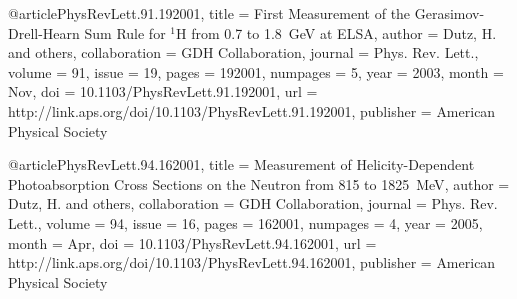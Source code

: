 @article{PhysRevLett.91.192001,
  title = {First Measurement of the Gerasimov-Drell-Hearn Sum Rule for $^{1}\mathrm{H}$ from 0.7 to 1.8~GeV at ELSA},
  author = {Dutz, H. and others},
  collaboration = {GDH Collaboration},
  journal = {Phys. Rev. Lett.},
  volume = {91},
  issue = {19},
  pages = {192001},
  numpages = {5},
  year = {2003},
  month = {Nov},
  doi = {10.1103/PhysRevLett.91.192001},
  url = {http://link.aps.org/doi/10.1103/PhysRevLett.91.192001},
  publisher = {American Physical Society}
}

@article{PhysRevLett.94.162001,
  title = {Measurement of Helicity-Dependent Photoabsorption Cross Sections on the Neutron from 815 to 1825~MeV},
  author = {Dutz, H. and others},
  collaboration = {GDH Collaboration},
  journal = {Phys. Rev. Lett.},
  volume = {94},
  issue = {16},
  pages = {162001},
  numpages = {4},
  year = {2005},
  month = {Apr},
  doi = {10.1103/PhysRevLett.94.162001},
  url = {http://link.aps.org/doi/10.1103/PhysRevLett.94.162001},
  publisher = {American Physical Society}
}

